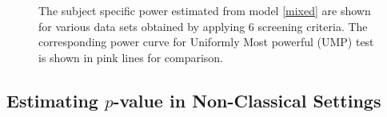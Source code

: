 \documentclass{article}
\begin{document}
\begin{figure}[hbtp]
   \centering
      \caption{The subject specific power estimated from model \ref{mixed} are shown for various data sets obtained by applying 6 screening criteria.  The corresponding power curve for Uniformly Most powerful (UMP) test is shown in pink lines for comparison.}
       \label{fig:power_screening_subject}	
\end{figure}


\subsection{Estimating $p$-value in Non-Classical Settings}
\end{document}
